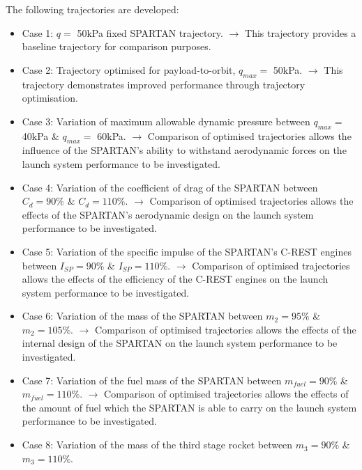 The following trajectories are developed: 
\begin{itemize}
	
	\item Case 1: $q = $ 50kPa fixed SPARTAN trajectory. \newline$\rightarrow$ This trajectory provides a baseline trajectory for comparison purposes.
	\item Case 2: Trajectory optimised for payload-to-orbit, $q_{max} = $ 50kPa. \newline$\rightarrow$ This trajectory demonstrates improved performance through trajectory optimisation.
	\item Case 3: Variation of maximum allowable dynamic pressure between $q_{max} = $ 40kPa \& $q_{max} = $ 60kPa. 
	\newline$\rightarrow$ Comparison of optimised trajectories allows the influence of the SPARTAN's ability to withstand aerodynamic forces on the launch system performance to be investigated.
	\item Case 4: Variation of the coefficient of drag of the SPARTAN between $C_d = 90\%$ \& $C_d = 110\%$. 
	\newline$\rightarrow$ Comparison of optimised trajectories allows the effects of the SPARTAN's aerodynamic design on the launch system performance to be investigated.
	\item Case 5: Variation of the specific impulse of the SPARTAN's C-REST engines between $I_{SP} = 90\%$ \& $I_{SP} = 110\%$. 
	\newline$\rightarrow$ Comparison of optimised trajectories allows the effects of the efficiency of the C-REST engines on the launch system performance to be investigated. 
	\item Case 6: Variation of the mass of the SPARTAN between $m_2 = 95\%$ \& $m_2 = 105\%$. 
	\newline$\rightarrow$ Comparison of optimised trajectories allows the effects of the internal design of the SPARTAN on the launch system performance to be investigated. 
	\item Case 7: Variation of the fuel mass of the SPARTAN between $m_{fuel} = 90\%$ \& $m_{fuel} = 110\%$. 
	\newline$\rightarrow$ Comparison of optimised trajectories allows the effects of the amount of fuel which the SPARTAN is able to carry on the launch system performance to be investigated. 
	\item Case 8: Variation of the mass of the third stage rocket between $m_3 = 90\%$ \& $m_3 = 110\%$. 

\end{itemize}
